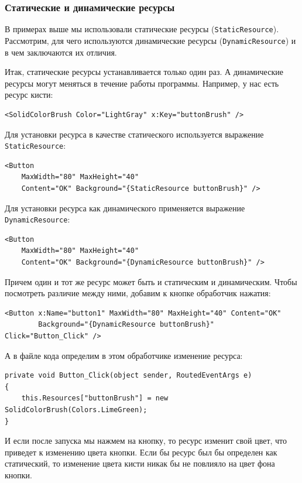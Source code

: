 \subsubsection{Статические и динамические ресурсы}
В примерах выше мы использовали статические ресурсы (\texttt{StaticResource}). Рассмотрим, для чего используются динамические ресурсы (\texttt{DynamicResource}) и в чем заключаются их отличия. 

Итак, статические ресурсы устанавливается только один раз. А динамические ресурсы могут меняться в течение работы программы. Например, у нас есть ресурс кисти:

\begin{verbatim}
<SolidColorBrush Color="LightGray" x:Key="buttonBrush" />
\end{verbatim}

Для установки ресурса в качестве статического используется выражение \texttt{StaticResource}:

\begin{verbatim}	
<Button 
    MaxWidth="80" MaxHeight="40" 
    Content="OK" Background="{StaticResource buttonBrush}" />
\end{verbatim}

Для установки ресурса как динамического применяется выражение \texttt{DynamicResource}:

\begin{verbatim}
<Button 
    MaxWidth="80" MaxHeight="40" 
    Content="OK" Background="{DynamicResource buttonBrush}" />
\end{verbatim}

Причем один и тот же ресурс может быть и статическим и динамическим. Чтобы посмотреть различие между ними, добавим к кнопке обработчик нажатия:

\begin{verbatim}
<Button x:Name="button1" MaxWidth="80" MaxHeight="40" Content="OK"
        Background="{DynamicResource buttonBrush}"  Click="Button_Click" />
\end{verbatim}
        
А в файле кода определим в этом обработчике изменение ресурса:

\begin{verbatim}
private void Button_Click(object sender, RoutedEventArgs e)
{
    this.Resources["buttonBrush"] = new SolidColorBrush(Colors.LimeGreen);
}
\end{verbatim}

И если после запуска мы нажмем на кнопку, то ресурс изменит свой цвет, что приведет к изменению цвета кнопки. Если бы ресурс был бы определен как статический, то изменение цвета кисти никак бы не повлияло на цвет фона кнопки.

